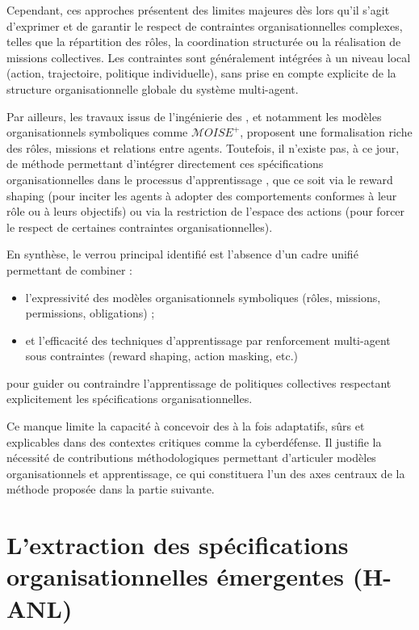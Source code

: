 Cependant, ces approches présentent des limites majeures dès lors qu’il s’agit d’exprimer et de garantir le respect de contraintes organisationnelles complexes, telles que la répartition des rôles, la coordination structurée ou la réalisation de missions collectives. Les contraintes sont généralement intégrées à un niveau local (action, trajectoire, politique individuelle), sans prise en compte explicite de la structure organisationnelle globale du système multi-agent.

Par ailleurs, les travaux issus de l’ingénierie des , et notamment les modèles organisationnels symboliques comme $\mathcal{M}OISE^+$, proposent une formalisation riche des rôles, missions et relations entre agents. Toutefois, il n’existe pas, à ce jour, de méthode permettant d’intégrer directement ces spécifications organisationnelles dans le processus d’apprentissage , que ce soit via le reward shaping (pour inciter les agents à adopter des comportements conformes à leur rôle ou à leurs objectifs) ou via la restriction de l’espace des actions (pour forcer le respect de certaines contraintes organisationnelles).

En synthèse, le verrou principal identifié est l’absence d’un cadre unifié permettant de combiner :
\begin{itemize}
    \item l’expressivité des modèles organisationnels symboliques (rôles, missions, permissions, obligations) ;
    \item et l’efficacité des techniques d’apprentissage par renforcement multi-agent sous contraintes (reward shaping, action masking, etc.)
\end{itemize}
pour guider ou contraindre l’apprentissage de politiques collectives respectant explicitement les spécifications organisationnelles.

Ce manque limite la capacité à concevoir des  à la fois adaptatifs, sûrs et explicables dans des contextes critiques comme la cyberdéfense. Il justifie la nécessité de contributions méthodologiques permettant d’articuler modèles organisationnels et apprentissage, ce qui constituera l’un des axes centraux de la méthode proposée dans la partie suivante.


\section{L'extraction des spécifications organisationnelles émergentes (H-ANL)}

